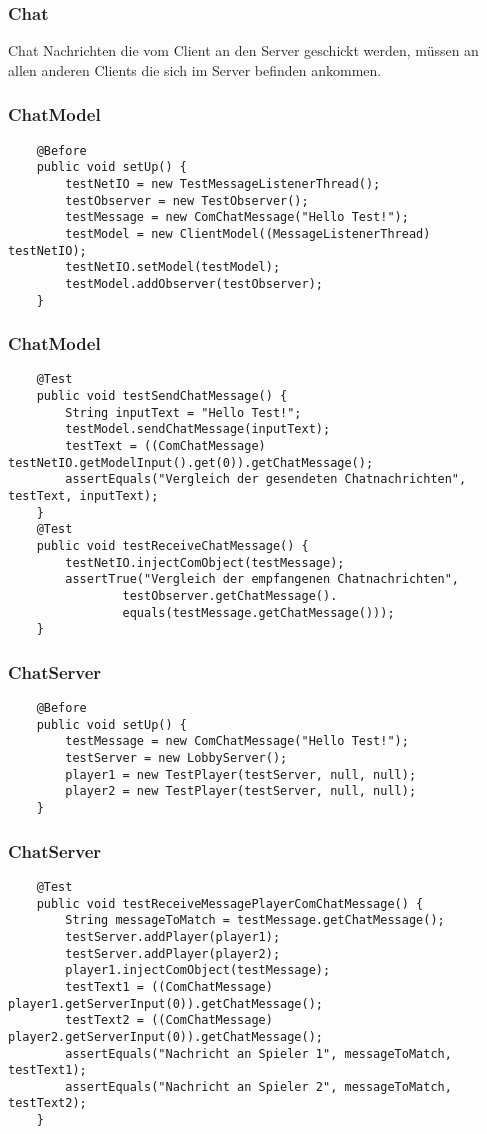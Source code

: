 \documentclass{beamer}
\begin{document}
\begin{frame}
\frametitle{Chat}
	\begin{block}
		{Chat} Nachrichten die vom Client an den Server geschickt werden, müssen an
		allen anderen Clients die sich im Server befinden ankommen.
	\end{block}
\end{frame}

\begin{frame}[fragile]
\frametitle{ChatModel}
\begin{lstlisting}
	@Before  
    public void setUp() {
		testNetIO = new TestMessageListenerThread();
		testObserver = new TestObserver();
		testMessage = new ComChatMessage("Hello Test!");
		testModel = new ClientModel((MessageListenerThread) testNetIO);
		testNetIO.setModel(testModel);
		testModel.addObserver(testObserver);
    }
\end{lstlisting}
\end{frame}


\begin{frame}[fragile]
\frametitle{ChatModel}
\begin{lstlisting}
	@Test
	public void testSendChatMessage() {
		String inputText = "Hello Test!";
		testModel.sendChatMessage(inputText);
		testText = ((ComChatMessage) 			testNetIO.getModelInput().get(0)).getChatMessage();
		assertEquals("Vergleich der gesendeten Chatnachrichten", testText, inputText);
	}	
	@Test
	public void testReceiveChatMessage() {
		testNetIO.injectComObject(testMessage);
		assertTrue("Vergleich der empfangenen Chatnachrichten", 
				testObserver.getChatMessage().
				equals(testMessage.getChatMessage()));
	}
\end{lstlisting}
\end{frame}


\begin{frame}[fragile]
\frametitle{ChatServer}
\begin{lstlisting}
	@Before
	public void setUp() {
		testMessage = new ComChatMessage("Hello Test!");
		testServer = new LobbyServer();
		player1 = new TestPlayer(testServer, null, null);
		player2 = new TestPlayer(testServer, null, null);
	}
\end{lstlisting}
\end{frame}


\begin{frame}[fragile]
\frametitle{ChatServer}
\begin{lstlisting}
	@Test
	public void testReceiveMessagePlayerComChatMessage() {
		String messageToMatch = testMessage.getChatMessage();
		testServer.addPlayer(player1);
		testServer.addPlayer(player2);
		player1.injectComObject(testMessage);
		testText1 = ((ComChatMessage) player1.getServerInput(0)).getChatMessage();
		testText2 = ((ComChatMessage) player2.getServerInput(0)).getChatMessage();
		assertEquals("Nachricht an Spieler 1", messageToMatch, testText1);
		assertEquals("Nachricht an Spieler 2", messageToMatch, testText2);
	}
\end{lstlisting}
\end{frame}


	
\end{document}
